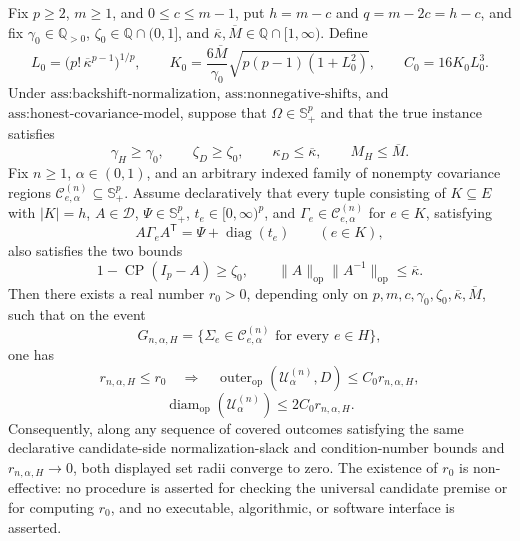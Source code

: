 Fix \(p\geq2\), \(m\geq1\), and \(0\leq c\leq m-1\), put \(h=m-c\) and \(q=m-2c=h-c\), and fix \(\gamma_0\in\mathbb Q_{>0}\), \(\zeta_0\in\mathbb Q\cap(0,1]\), and \(\overline\kappa,\overline M\in\mathbb Q\cap[1,\infty)\). Define
\[
L_0=\bigl(p!\,\overline\kappa^{p-1}\bigr)^{1/p},
\qquad
K_0=\frac{6\overline M}{\gamma_0}
\sqrt{p(p-1)(1+L_0^2)},
\qquad
C_0=16K_0L_0^3.
\]
Under \(\text{ass:backshift-normalization}\), \(\text{ass:nonnegative-shifts}\), and \(\text{ass:honest-covariance-model}\), suppose that \(\Omega\in\mathbb S_+^p\) and that the true instance satisfies
\[
\gamma_H\geq\gamma_0,\qquad
\zeta_D\geq\zeta_0,\qquad
\kappa_D\leq\overline\kappa,\qquad
M_H\leq\overline M.
\]
Fix \(n\geq1\), \(\alpha\in(0,1)\), and an arbitrary indexed family of nonempty covariance regions \(\mathcal C^{(n)}_{e,\alpha}\subseteq\mathbb S_{+}^p\). Assume declaratively that every tuple consisting of \(K\subseteq E\) with \(|K|=h\), \(A\in\mathcal D\), \(\Psi\in\mathbb S_+^p\), \(t_e\in[0,\infty)^p\), and \(\Gamma_e\in\mathcal C^{(n)}_{e,\alpha}\) for \(e\in K\), satisfying
\[
A\Gamma_eA^{\mathsf T}=\Psi+\operatorname{diag}(t_e)
\qquad(e\in K),
\]
also satisfies the two bounds
\[
1-\operatorname{CP}(I_p-A)\geq\zeta_0,
\qquad
\|A\|_{\mathrm{op}}\|A^{-1}\|_{\mathrm{op}}
\leq\overline\kappa.
\]
Then there exists a real number \(r_0>0\), depending only on \(p,m,c,\gamma_0,\zeta_0,\overline\kappa,\overline M\), such that on the event
\[
G_{n,\alpha,H}
=\{\Sigma_e\in\mathcal C^{(n)}_{e,\alpha}\text{ for every }e\in H\},
\]
one has
\[
r_{n,\alpha,H}\leq r_0
\quad\Longrightarrow\quad
\operatorname{outer}_{\mathrm{op}}(\mathcal U^{(n)}_\alpha,D)
\leq C_0r_{n,\alpha,H},
\]
\[
\operatorname{diam}_{\mathrm{op}}(\mathcal U^{(n)}_\alpha)
\leq2C_0r_{n,\alpha,H}.
\]
Consequently, along any sequence of covered outcomes satisfying the same declarative candidate-side normalization-slack and condition-number bounds and \(r_{n,\alpha,H}\to0\), both displayed set radii converge to zero. The existence of \(r_0\) is non-effective: no procedure is asserted for checking the universal candidate premise or for computing \(r_0\), and no executable, algorithmic, or software interface is asserted.